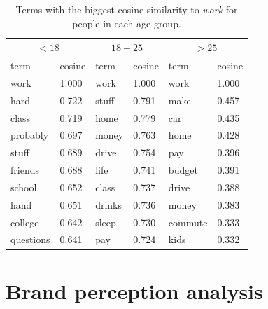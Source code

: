 \documentclass[a4paper,12pt,twoside,openright]{report}
\newcommand{\ti}{\textit}
\begin{document}
\begin{table}[h]
\centering
\begin{tabular}{ll|ll|ll}
\multicolumn{2}{c}{$<18$} & \multicolumn{2}{c}{$18-25$} & \multicolumn{2}{c}{$> 25$} \\ \hline
term             & cosine            & term              & cosine          & term              & cosine              \\ \hline
work          & 1.000                  & work                  & 1.000  & work & 1.000                   \\
hard                 & 0.722                  & stuff                  & 0.791          & make & 0.457          \\
class                 & 0.719                  & home                  & 0.779         &car & 0.435           \\
probably                 & 0.697                  & money                  & 0.763          & home & 0.428          \\
stuff                 & 0.689                  & drive                  & 0.754          & pay & 0.396          \\
friends                 & 0.688                  & life                  & 0.741        &budget&0.391            \\
school                 & 0.652                  & class                  & 0.737       &drive&0.388             \\
hand                 & 0.651                  & drinks                  & 0.736          &money&0.383          \\
college                 & 0.642                  &  sleep                 &   0.730    &commute&0.333              \\
questions                 & 0.641                  & pay                  & 0.724        &kids&0.332           \\ \hline                 
\end{tabular}
\caption{Terms with the biggest cosine similarity to \ti{work} for people in each age group.}
\label{tab:chap5:reverse_dic_age}
\end{table}

\section{Brand perception analysis}
\end{document}
